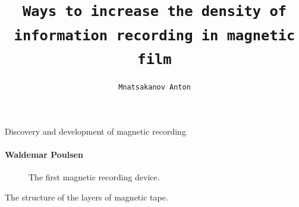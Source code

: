 \documentclass{beamer}
\title{\normalsize{\texttt{Ways to increase the density of information recording in magnetic film}}} %
\author{\texttt{Mnatsakanov Anton}}
\begin{document}
  \shorthandoff{-}
  \frame[c]{\maketitle}



    \begin{frame}{Discovery and development of magnetic recording}
      \framesubtitle{Waldemar Poulsen}%
        \begin{figure}[h]
          \caption{The first magnetic recording device.}
          
        \end{figure}
    \end{frame}
    \begin{frame}[label=lists]{The structure of the layers of magnetic tape.}
 \begin{figure}[h]
  \end{figure}
    \end{frame}
\end{document}

